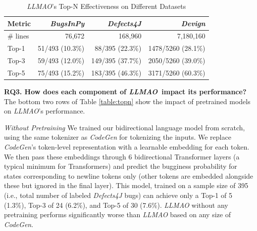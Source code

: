 \documentclass[12pt,openany,oneside,table]{cmuthesis}
\begin{document}
    \begin{table}[t]
    \centering
    \caption{\textit{LLMAO}'s Top-N Effectiveness on Different Datasets}
    \begin{tabular}{l|rrr}
    \toprule
    \textbf{Metric} &\textbf{\textit{BugsInPy}} & \textbf{\textit{Defects4J}} & \textbf{\textit{Devign}}\\
    \midrule
    \# lines  &  76,672 & 168,960 & 7,180,160\\
    Top-1  &  51/493 (10.3\%) & 88/395 (22.3\%) & 1478/5260 (28.1\%)\\
    Top-3  &  59/493 (12.0\%) & 149/395 (37.7\%)  & 2050/5260 (39.0\%)\\
    Top-5  &  75/493 (15.2\%) & 183/395 (46.3\%)  & 3171/5260 (60.3\%)\\
    \bottomrule
    \end{tabular}
    \label{table:topn-rq4}
    \end{table}
    
    \noindent\textbf{RQ3. How does each component of \textit{LLMAO}\ impact its performance?} 
    The bottom two rows of Table \ref{table:topn} show the impact of pretrained models on \textit{LLMAO}'s performance. 
    
    \vspace{0.5ex}
    \emph{Without Pretraining} We trained our bidirectional language model from scratch, using the same tokenizer as \textit{CodeGen} for tokenizing the inputs. We replace \textit{CodeGen}'s token-level representation with a learnable embedding for each token. We then pass these embeddings through 6 bidirectional Transformer layers (a typical minimum for Transformers) and predict the bugginess probability for states corresponding to newline tokens only (other tokens are embedded alongside these but ignored in the final layer). This model, trained on a sample size of 395 (i.e., total number of labeled \textit{Defects4J} bugs) can achieve only a Top-1 of 5 (1.3\%), Top-3 of 24 (6.2\%), and Top-5 of 30 (7.6\%). \textit{LLMAO} without any pretraining performs significantly worse than \textit{LLMAO} based on any size of \textit{CodeGen}. 
    
\end{document}
